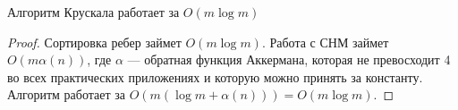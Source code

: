 \begin{theorem}
Алгоритм Крускала работает за $O(m \log m)$
\end{theorem}

\begin{proof}
Сортировка ребер займет $O(m \log m)$.
Работа с СНМ займет $O(m \alpha(n))$, где $\alpha$ — обратная функция Аккермана, которая не превосходит 4 во всех практических приложениях и которую можно принять за константу.
Алгоритм работает за $O(m(\log m +\alpha(n)))= O(m \log m)$. 
\end{proof}


    